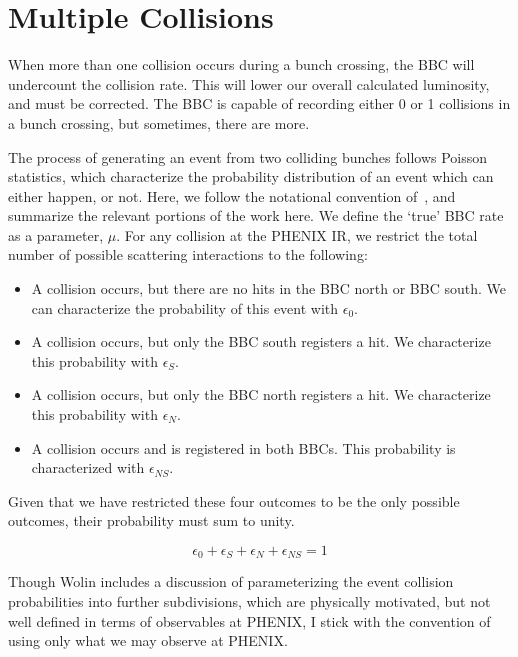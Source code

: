 \clearpage
\chapter{Multiple Collisions}
\label{ch:MultipleCollisions}

When more than one collision occurs during a bunch crossing, the BBC will
undercount the collision rate. This will lower our overall calculated
luminosity, and must be corrected. The BBC is capable of recording either 0 or 1
collisions in a bunch crossing, but sometimes, there are more.

The process of generating an event from two colliding bunches follows Poisson
statistics, which characterize the probability distribution of an event which
can either happen, or not. Here, we follow the notational convention
of~\cite{Wolin2016}, and summarize the relevant portions of the work here. We
define the `true' BBC rate as a parameter, $\mu$. For any collision at the
PHENIX IR, we restrict the total number of possible scattering interactions to
the following:

\begin{itemize}
  \item A collision occurs, but there are no hits in the BBC north or BBC south.
    We can characterize the probability of this event with $\epsilon_0$.
  \item A collision occurs, but only the BBC south registers a hit. We
    characterize this probability with $\epsilon_S$. 
  \item A collision occurs, but only the BBC north registers a hit. We
    characterize this probability with $\epsilon_N$. 
  \item A collision occurs and is registered in both BBCs. This probability is
    characterized with $\epsilon_{NS}$.
\end{itemize}

Given that we have restricted these four outcomes to be the only possible
outcomes, their probability must sum to unity.

\begin{equation}
  \epsilon_0 + \epsilon_S + \epsilon_N + \epsilon_{NS} = 1
  \label{eq:bbc_collision_probabilty}
\end{equation}

Though Wolin includes a discussion of parameterizing the event collision
probabilities into further subdivisions, which are physically motivated, but not
well defined in terms of observables at PHENIX, I stick with the convention of
using only what we may observe at PHENIX.

